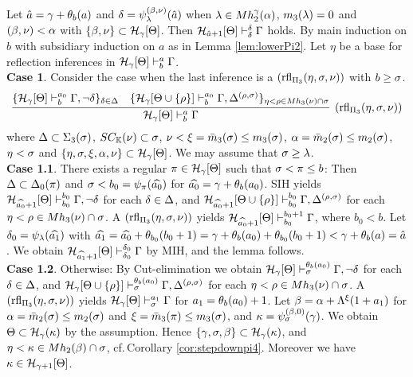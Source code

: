 \documentclass{article}
\newcommand{\mK}{\mathbb{K}}
\begin{document}
Let $\hat{a}=\gamma+\theta_{b}(a)$ and 
$\delta=\psi_{\lambda}^{(\beta,\nu)}(\hat{a})$ when $\lambda\in Mh_{2}^{\gamma}(\alpha)$,
$m_{3}(\lambda)=0$ and $(\beta,\nu)<\alpha$
with
$\{\beta,\nu\}\subset{\cal H}_{\gamma}[\Theta]$.
Then
${\cal H}_{\hat{a}+1}[\Theta]\vdash^{\delta}_{\delta}\Gamma$ holds.
\elem
\bprf
By main induction on $b$ with subsidiary induction on $a$ as in Lemma \ref{lem:lowerPi2}.
Let $\eta$ be a base for reflection inferences in ${\cal H}_{\gamma}[\Theta]\vdash^{a}_{b}\Gamma$.
\\
\textbf{Case 1}. 
Consider the case when the last inference is a 
$({\rm rfl}_{\Pi_{3}}(\eta,\sigma,\nu))$ with $b\geq\sigma$.
{\small
\[
\infer[({\rm rfl}_{\Pi_{3}}(\eta,\sig,\nu))]{
\calh_{\gam}[\Tht]\vdash^{a}_{b}\Gam}
{
\{
\mathcal{H}_{\gam}[\Tht]\vdash^{a_{0}}_{b}\Gamma, \lnot\del
\}_{\del\in\Del}
&
\{
\mathcal{H}_{\gam}[\Tht\cup \{\rho\}]\vdash^{a_{0}}_{b}\Gamma, 
\Del^{(\rho,\sig)}\}_{\eta<\rho\in Mh_{3}(\nu)\cap \sig}
}
\]
}
where 
$\Delta\subset\Sigma_{3}(\sigma)$, $SC_{\mK}(\nu)\subset\sig$, $\nu<\xi=\bar{m}_{3}(\sigma)\leq m_{3}(\sigma)$, 
$\alpha=\bar{m}_{2}(\sigma)\leq m_{2}(\sigma)$, $\eta<\sigma$
and $\{\eta,\sigma,\xi,\alpha,\nu\}\subset{\cal H}_{\gamma}[\Theta]$.
We may assume that $\sigma\geq\lambda$.
\\
\textbf{Case 1.1}. There exists a regular $\pi\in{\cal H}_{\gamma}[\Theta]$ such that $\sigma<\pi\leq b$:
Then $\Delta\subset\Delta_{0}(\pi)$ and $\sigma<b_{0}=\psi_{\pi}(\widehat{a_{0}})$ for
$\widehat{a_{0}}=\gamma+\theta_{b}(a_{0})$.
SIH yields
$\mathcal{H}_{\widehat{a_{0}}+1}[\Theta]\vdash^{b_{0}}_{b_{0}}\Gamma, \lnot\delta$ for each $\delta\in\Delta$,
and
$\mathcal{H}_{\widehat{a_{0}}+1}[\Theta\cup \{\rho\}]\vdash^{b_{0}}_{b_{0}}\Gamma, 
\Delta^{(\rho,\sigma)}$ for each 
$\eta<\rho\in Mh_{3}(\nu)\cap \sigma$.
A $({\rm rfl}_{\Pi_{3}}(\eta,\sigma,\nu))$ yields
$\mathcal{H}_{\widehat{a_{0}}+1}[\Theta]\vdash^{b_{0}+1}_{b_{0}}\Gamma$, where $b_{0}<b$.
Let
$\delta_{0}=\psi_{\lambda}(\widehat{a_{1}})$ with 
$\widehat{a_{1}}=\widehat{a_{0}}+\theta_{b_{0}}(b_{0}+1)=\gamma+\theta_{b}(a_{0})+\theta_{b_{0}}(b_{0}+1)<
\gamma+\theta_{b}(a)=\hat{a}$.
We obtain
$\mathcal{H}_{\widehat{a_{1}}+1}[\Theta]\vdash^{\delta_{0}}_{\delta_{0}}\Gamma$
by MIH, and the lemma follows.
\\
\textbf{Case 1.2}. Otherwise: 
By Cut-elimination we obtain
$\mathcal{H}_{\gamma}[\Theta]\vdash^{\theta_{b}(a_{0})}_{\sigma}\Gamma, \lnot\delta$ for each $\delta\in\Delta$, and
$\mathcal{H}_{\gamma}[\Theta\cup \{\rho\}]\vdash^{\theta_{b}(a_{0})}_{\sigma}\Gamma, 
\Delta^{(\rho,\sigma)}$ for each $\eta<\rho\in Mh_{3}(\nu)\cap \sigma$.
A $({\rm rfl}_{\Pi_{3}}(\eta,\sigma,\nu))$ yields
$\mathcal{H}_{\gamma}[\Theta]\vdash^{a_{1}}_{\sigma}\Gamma$ for $a_{1}=\theta_{b}(a_{0})+1$.
Let $\beta=\alpha+\Lambda^{\xi}(1+a_{1})$ for 
$\alpha=\bar{m}_{2}(\sigma)\leq m_{2}(\sigma)$ and $\xi=\bar{m}_{3}(\pi)\leq m_{3}(\sigma)$, and 
$\kappa=\psi_{\sigma}^{(\beta,0)}(\gamma)$.
We obtain $\Theta\subset{\cal H}_{\gamma}(\kappa)$ by the assumption.
Hence $\{\gamma,\sigma, \beta\}\subset{\cal H}_{\gamma}(\kappa)$, and $\eta<\kappa\in Mh_{2}(\beta)\cap \sigma$,
cf.\,Corollary \ref{cor:stepdownpi4}.
Moreover we have $\kappa\in{\cal H}_{\gamma+1}[\Theta]$.
\end{document}
